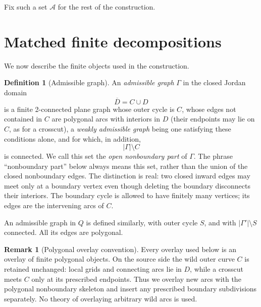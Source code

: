 \documentclass[11pt]{article}
\theoremstyle{mainplain}
\theoremstyle{mainroman}
\theoremstyle{definition}
\newtheorem{definition}[theorem]{Definition}
\newtheorem{remark}[theorem]{Remark}
\numberwithin{equation}{section}
\begin{document}
Fix such a set $\mathcal A$ for the rest of the construction.

\section{Matched finite decompositions}\label{matched-finite-decompositions}

We now describe the finite objects used in the construction.

\begin{definition}[Admissible graph]\label{def:admissible-graph}
An \emph{admissible graph} $\Gamma$ in the closed Jordan domain
\[
\overline D=C\cup D
\]
is a finite 2-connected plane graph whose outer cycle is \(C\), whose edges not contained in \(C\) are polygonal arcs with interiors in \(D\) (their endpoints may lie on \(C\), as for a crosscut), a \emph{weakly admissible graph} being one satisfying these conditions alone, and for which, in addition,
\[
 |\Gamma|\setminus C
\]
is connected. We call this set the \emph{open nonboundary part} of
\(\Gamma\). The phrase ``nonboundary part'' below always means this
set, rather than the union of the closed nonboundary edges. The
distinction is real: two closed inward edges may meet only at a boundary
vertex even though deleting the boundary disconnects their interiors.
The boundary cycle is allowed to have finitely many vertices; its edges
are the intervening arcs of \(C\).

An admissible graph in \(Q\) is defined similarly, with outer cycle
\(S\), and with \(|\Gamma'|\setminus S\) connected. All its edges are
polygonal.
\end{definition}


\begin{remark}[Polygonal overlay convention]\label{rem:polygonal-overlay-convention}
Every overlay used below is an overlay of finite polygonal objects.
On the source side the wild outer curve $C$ is retained unchanged:
local grids and connecting arcs lie in $D$, while a crosscut meets $C$
only at its prescribed endpoints. Thus we overlay new arcs with the
polygonal nonboundary skeleton and insert any prescribed boundary
subdivisions separately. No theory of overlaying arbitrary wild arcs
is used.
\end{remark}
\end{document}

